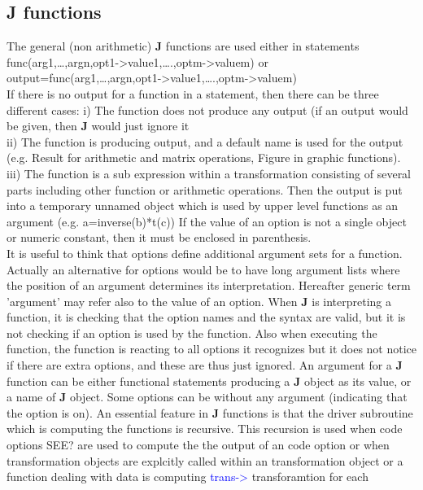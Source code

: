 \subsection{\textbf{J} functions}
\label{jfuncs0}
The general (non arithmetic) \textbf{J} functions are used either in statements
func(arg1,…,argn,opt1->value1,….,optm->valuem)
or
output=func(arg1,…,argn,opt1->value1,….,optm->valuem)\\
If there is no output for a function in a statement, then there can be three different cases:
i) The function does not produce any output (if an output would be given, then \textbf{J} would just
ignore it\\
ii) The function is producing output, and a default name is used for the output (e.g. Result
for arithmetic and matrix operations, Figure in graphic functions).\\
iii) The function is a sub expression within a transformation consisting of several parts including
other function or arithmetic operations. Then the output is put into a temporary unnamed
object which is used by upper level functions as an argument (e.g. a=\textcolor{VioletRed}{inverse}(b)*t(c))
If the value of an option is not a single object or numeric constant, then it must be enclosed in
parenthesis.\\
It is useful to think that options define additional argument sets for a function. Actually
an alternative for options would be to have long argument lists where the position of an
argument determines its interpretation. Hereafter generic term 'argument' may refer also to
the value of an option.
When \textbf{J} is interpreting a function, it is checking that the option names and the syntax
are valid, but it is not checking if an option is used by the function. Also when executing the
function, the function is reacting to all options it recognizes but it does not notice if there are
extra options, and these are thus just ignored.
An argument for a \textbf{J} function can be either functional statements producing a \textbf{J} object as its
value, or a name of \textbf{J} object. Some options can be without any argument (indicating that the
option is on).
An essential feature in \textbf{J} functions is that the driver subroutine which is computing
the functions is recursive. This recursion is used when code options SEE? are used to compute
the the output of an code option or when transformation objects are explcitly called
within an transformation object or a function dealing with data is computing \textcolor{blue}{trans->} transforamtion for each
